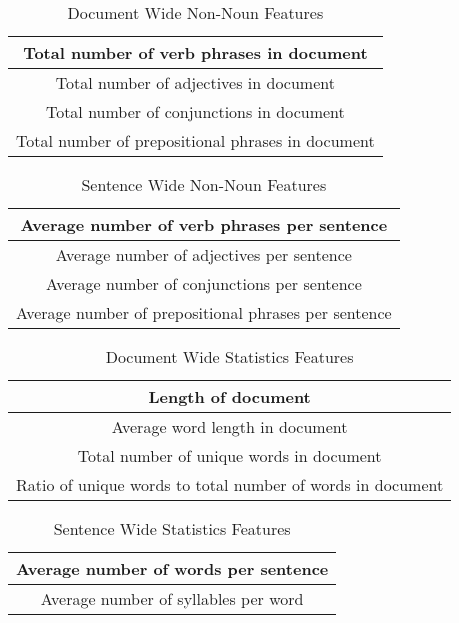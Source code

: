 \documentclass[]{article}
\begin{document}
\begin{table}[!htbp]
	\begin{center}
		\begin{tabular}{| c |} \hline
			Total number of verb phrases in document \\ \hline
			Total number of adjectives in document \\ \hline
			Total number of conjunctions in document \\ \hline
			Total number of prepositional phrases in document \\ \hline
		\end{tabular}
	\end{center}
	\caption{Document Wide Non-Noun Features}
	\label{table:group3}
\end{table}

\begin{table}[!htbp]
	\begin{center}
		\begin{tabular}{| c |} \hline
			Average number of verb phrases per sentence \\ \hline
			Average number of adjectives per sentence \\  \hline
			Average number of conjunctions per sentence \\ \hline
			Average number of prepositional phrases per sentence \\ \hline
		\end{tabular}
	\end{center}
	\caption{Sentence Wide Non-Noun Features}
	\label{table:group4}
\end{table}

\begin{table}[!htbp]
	\begin{center}
		\begin{tabular}{| c |} \hline
      Length of document \\ \hline
			Average word length in document \\ \hline
      Total number of unique words in document \\ \hline
      Ratio of unique words to total number of words in document \\ \hline
		\end{tabular}
	\end{center}
	\caption{Document Wide Statistics Features}
	\label{table:group5}
\end{table}

\begin{table}[!htbp]
	\begin{center}
		\begin{tabular}{| c |} \hline
			Average number of words per sentence \\ \hline
      Average number of syllables per word \\ \hline
		\end{tabular}
	\end{center}
	\caption{Sentence Wide Statistics Features}
	\label{table:group6}
\end{table}
\end{document}
